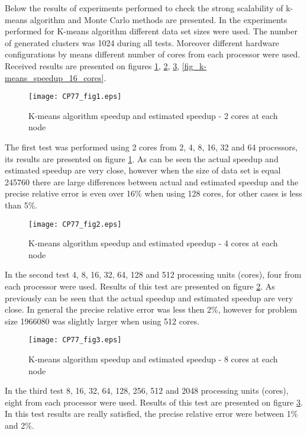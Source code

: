 \documentclass[runningheads]{llncs}
\begin{document}
Below the results of experiments performed to check the strong scalability of k-means algorithm and Monte Carlo methods are presented. In the experiments performed for K-means algorithm different data set sizes were used. The number of generated clusters was 1024 during all tests. Moreover different hardware configurations by means different number of cores from each processor were used. Received results are presented on figures  \ref{fig_k-means_speedup_2_cores}, \ref{fig_k-means_speedup_4_cores}, \ref{fig_k-means_speedup_8_cores}, \ref{fig_k-means_speedup_16_cores}.

\begin{figure}[bht!]
  \centering
  \texttt{[image: CP77\_fig1.eps]}
  \caption{K-means algorithm speedup and estimated speedup - 2 cores at each node}
  \label{fig_k-means_speedup_2_cores}
\end{figure}

The first test was performed using 2 cores from 2, 4, 8, 16, 32 and 64 processors, its results are presented on figure \ref{fig_k-means_speedup_2_cores}. As can be seen the actual speedup and estimated speedup are very close, however when the size of data set is equal 245760 there are large differences between actual and estimated speedup and the precise relative error is even over 16\% when using 128 cores, for other cases is less than 5\%. 

\begin{figure}[bht!]
  \centering
  \texttt{[image: CP77\_fig2.eps]}
  \caption{K-means algorithm speedup and estimated speedup - 4 cores at each node}
  \label{fig_k-means_speedup_4_cores}
\end{figure}

In the second test 4, 8, 16, 32, 64, 128 and 512 processing units (cores), four from each processor were used. Results of this test are presented on figure \ref{fig_k-means_speedup_4_cores}. As previously can be seen that the actual speedup and estimated speedup are very close. In general the precise relative error was less then 2\%, however for problem size 1966080 was slightly larger when using 512 cores.  

\begin{figure}[bht!]
  \centering
  \texttt{[image: CP77\_fig3.eps]}
  \caption{K-means algorithm speedup and estimated speedup - 8 cores at each node}
  \label{fig_k-means_speedup_8_cores}
\end{figure}

In the third test 8, 16, 32, 64, 128, 256, 512 and 2048 processing units (cores), eight from each processor were used. Results of this test are presented on figure \ref{fig_k-means_speedup_8_cores}. In this test results are really satisfied, the precise relative error were between 1\% and 2\%.  
\end{document}
